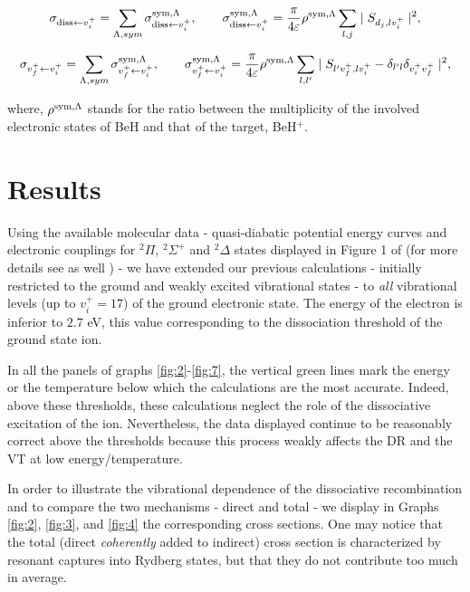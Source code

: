 \documentclass[reviewcopy]{elsarticle}
\begin{document}
\begin{equation}\label{eqDR}
\sigma _{{\rm diss} \leftarrow v_{i}^{+}}=\sum_{\Lambda,sym} \sigma _{{\rm diss} \leftarrow v_{i}^{+}}^{{\rm sym},\Lambda},
\quad \quad
\sigma _{{\rm diss} \leftarrow v_{i}^{+}}^{{\rm sym},\Lambda}=\frac{\pi}{4\varepsilon} \rho^{{\rm sym},\Lambda}\sum_{l,j}\mid S_{d_{j},lv_{i}^{+}}\mid^2,
\end{equation}

\begin{equation}\label{eqVE_VdE}
\sigma _{v_{f}^{+} \leftarrow v_{i}^{+}}=\sum_{\Lambda,sym} \sigma _{v_{f}^{+}\leftarrow v_{i}^{+}}^{{\rm sym},\Lambda}, 
\quad \quad
\sigma _{v_{f}^{+} \leftarrow v_{i}^{+}}^{{\rm sym},
\Lambda}=\frac{\pi}{4\varepsilon} \rho^{{\rm sym},\Lambda}\sum_{l,l'}\mid S_{l' v_{f}^{+},lv_{i}^{+}}-\delta_{l'l}\delta_{v_{i}^{+}v_{f}^{+}}\mid^2,
\end{equation}

\noindent
where, $\rho^{{\rm sym},\Lambda}$ stands for the ratio between the multiplicity of the involved electronic states of BeH and that of the target, BeH$^+$.

\section{Results}\label{res_disc}


Using the available molecular data - quasi-diabatic potential energy curves and electronic couplings for \ensuremath{^{2}\Pi}, \ensuremath{^{2}\Sigma^{+}} and
\ensuremath{^{2}\Delta} states displayed 
in Figure 1 of \cite{niyonzima2013} (for more details see as well \cite{roos:09,Strömholm1995}) - we have extended our previous calculations
- initially restricted to the ground and weakly excited vibrational states 
- to 
{\textit{all}} vibrational levels (up to $v_i^+ =17$) of the ground electronic state.
The energy of the electron is inferior to $2.7$ eV, this value corresponding to the dissociation threshold of the ground state ion.

In all the panels of graphs
\ref{fig:2}-\ref{fig:7}, the vertical green lines mark the energy or the temperature below
which the calculations are the most accurate. Indeed, above these thresholds,
these calculations neglect the role of the dissociative excitation of the ion. Nevertheless, the
data displayed continue to be reasonably correct above the thresholds because
this process weakly affects the DR and the VT at low energy/temperature.

In order to illustrate the vibrational dependence of the dissociative recombination and to compare the two mechanisms - direct and total - we display in Graphs \ref{fig:2}, \ref{fig:3}, and \ref{fig:4} the corresponding cross sections. 
 One may notice that the total (direct {\textit{coherently}} added to indirect) cross section is characterized by 
resonant captures into Rydberg states, but that they do not contribute too much in average.
\end{document}

